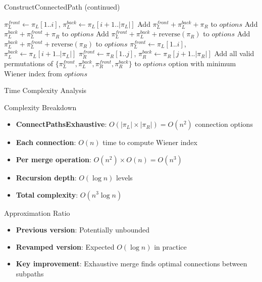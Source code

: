 \documentclass[11pt]{beamer}
\begin{document}
\begin{frame}{ConstructConnectedPath (continued)}
	\begin{algorithmic}[1]
		 
		\State $\pi_L^{front} \gets \pi_L[1..i]$, $\pi_L^{back} \gets \pi_L[i+1..|\pi_L|]$
		\State Add $\pi_L^{front} + \pi_L^{back} + \pi_R$ to $options$
		\State Add $\pi_L^{back} + \pi_L^{front} + \pi_R$ to $options$
		\State Add $\pi_L^{front} + \pi_L^{back} + \text{reverse}(\pi_R)$ to $options$
		\State Add $\pi_L^{back} + \pi_L^{front} + \text{reverse}(\pi_R)$ to $options$
		\Else {}
		\State $\pi_L^{front} \gets \pi_L[1..i]$, $\pi_L^{back} \gets \pi_L[i+1..|\pi_L|]$
		\State $\pi_R^{front} \gets \pi_R[1..j]$, $\pi_R^{back} \gets \pi_R[j+1..|\pi_R|]$
		\State Add all valid permutations of $\{\pi_L^{front}, \pi_L^{back}, \pi_R^{front}, \pi_R^{back}\}$ to $options$
		\State {}
		\EndIf
		\State \Return option with minimum Wiener index from $options$
	\end{algorithmic}
\end{frame}

\begin{frame}{Time Complexity Analysis}
	\begin{block}{Complexity Breakdown}
		\begin{itemize}
			\item \textbf{ConnectPathsExhaustive}: $O(|\pi_L| \times |\pi_R|) = O(n^2)$ connection options
			\item \textbf{Each connection}: $O(n)$ time to compute Wiener index
			\item \textbf{Per merge operation}: $O(n^2) \times O(n) = O(n^3)$
			\item \textbf{Recursion depth}: $O(\log n)$ levels
			\item \textbf{Total complexity}: $O(n^3 \log n)$
		\end{itemize}
	\end{block}

	\begin{block}{Approximation Ratio}
		\begin{itemize}
			\item \textbf{Previous version}: Potentially unbounded
			\item \textbf{Revamped version}: Expected $O(\log n)$ in practice
			\item \textbf{Key improvement}: Exhaustive merge finds optimal connections between subpaths
		\end{itemize}
	\end{block}
\end{frame}
\end{document}

